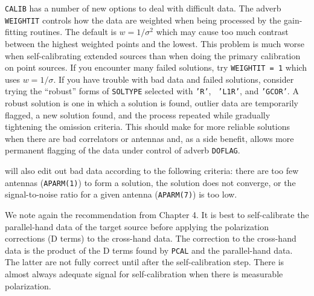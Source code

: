      {\tt CALIB} has a number of new options to deal with difficult
data.  The adverb {\tt WEIGHTIT} controls how the data are weighted
when being processed by the gain-fitting routines.  The default is $w
= 1 / \sigma^2$ which may cause too much contrast between the highest
weighted points and the lowest.  This problem is much worse when
self-calibrating extended sources than when doing the primary
calibration on point sources.  If you encounter many failed solutions,
try {\tt WEIGHTIT = 1} which uses $w = 1 / \sigma$.  If you have
trouble with bad data and failed solutions, consider trying the
``robust'' forms of {\tt SOLTYPE} selected with {\tt 'R'}, {\tt
'L1R'}, and {\tt 'GCOR'}\@.  A robust solution is one in which a
solution is found, outlier data are temporarily flagged, a new
solution found, and the process repeated while gradually tightening
the omission criteria.  This should make for more reliable solutions
when there are bad correlators or antennas and, as a side benefit,
allows more permanent flagging of the data under control of adverb
{\tt DOFLAG}\@.

    {\tt {}} will also edit out bad data according to the
following criteria:
\xben
\Item there are too few antennas ({\tt APARM(1)}) to form a
      solution,
\Item the solution does not converge, or
\Item the signal-to-noise ratio for a given antenna ({\tt APARM(7)})
      is too low.
\xeen
{}

We note again the recommendation from Chapter 4.  It is best to
self-calibrate the parallel-hand data of the target source before
applying the polarization corrections (D terms) to the cross-hand
data.  The correction to the cross-hand data is the product of the D
terms found by {\tt PCAL} and the parallel-hand data.  The latter are
not fully correct until after the self-calibration step.  There is
almost always adequate signal for self-calibration when there is
measurable polarization.


